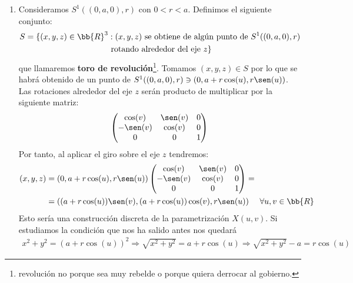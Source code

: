 \begin{ejemplo}
\begin{enumerate}
        Si la cuádrica $S$ no tiene punto singulares (los tiene en el infinito) y no es vacía, entonces es una superficie de $\bb{R}^3$. Esto nos dice que los elipsoides, hiperboloides, paraboloides, cilindros y planos son superficies. Nos quedarían fuera los conos y los planos secantes, que en principio no podremos concluir nada con el ejemplo anterior.

        \item Consideramos $S^1((0,a,0), r)$ con $0<r<a$. Definimos el siguiente conjunto:
        \begin{gather*}
            S = \{(x,y,z)\in \bb{R}^3 : (x,y,z) \text{ se obtiene de algún punto de }S^1((0,a,0), r)\\
            \text{ rotando alrededor del eje }z\}
        \end{gather*}
        que llamaremos \textbf{toro de revolución}\footnote{revolución no porque sea muy rebelde o porque quiera derrocar al gobierno.}. Tomamos $(x,y,z)\in S$ por lo que se habrá obtenido de un punto de $S^1((0,a,0), r)\owns (0,a+r\cos(u), r\sen(u))$. Las rotaciones alrededor del eje $z$ serán producto de multiplicar por la siguiente matriz:
        \begin{gather*}
            \begin{pmatrix}
                \cos(v) & \sen(v) & 0\\
                -\sen(v) & \cos(v) & 0\\
                0 & 0 & 1
            \end{pmatrix}
        \end{gather*}
        Por tanto, al aplicar el giro sobre el eje $z$ tendremos:
        \begin{align*}
            (x,y,z) &= (0,a+r\cos(u), r\sen(u)) \begin{pmatrix}
                \cos(v) & \sen(v) & 0\\
                -\sen(v) & \cos(v) & 0\\
                0 & 0 & 1
            \end{pmatrix}
            =\\ &=((a+r\cos(u))\sen(v), (a+r\cos(u))\cos(v), r\sen(u)) \ \ \ \ \forall u,v\in \bb{R}
        \end{align*}
        Esto sería una construcción discreta de la parametrización $X(u,v)$. Si estudiamos la condición que nos ha salido antes nos quedará
        \begin{gather*}
            x^2 + y^2 = (a+r\cos(u))^2 \Rightarrow \sqrt{x^2 + y^2} = a+r\cos(u) \Rightarrow \sqrt{x^2 + y^2} -a = r\cos(u)

\end{gather*}
\end{enumerate}
\end{ejemplo}

